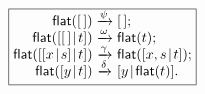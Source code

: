 \documentclass[11pt]{article}
\begin{document}
\TeXtoEPS
\(
\boxed{
\begin{array}{@{}r@{\;}c@{\;}l@{}}
\fun{flat}(\el)                   & \xrightarrow{\smash{\psi}} 
                                  & \el;\\
\fun{flat}(\cons{\el}{t})         & \xrightarrow{\smash{\omega}}
                                  & \fun{flat}(t);\\
\fun{flat}(\cons{\cons{x}{s}}{t}) & \xrightarrow{\smash{\gamma}}
                                  & \fun{flat}(\cons{x,s}{t});\\
\fun{flat}(\cons{y}{t})           & \xrightarrow{\smash{\delta}}
                                  & \cons{y}{\fun{flat}(t)}.
\end{array}}
\)
\endTeXtoEPS
\end{document}
